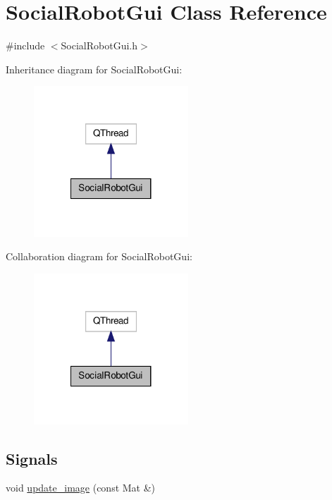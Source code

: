 \hypertarget{classSocialRobotGui}{\section{Social\-Robot\-Gui Class Reference}
\label{classSocialRobotGui}
}


{\ttfamily \#include $<$Social\-Robot\-Gui.\-h$>$}



Inheritance diagram for Social\-Robot\-Gui\-:\nopagebreak
\begin{figure}[H]
\begin{center}
\leavevmode
\includegraphics[width=164pt]{classSocialRobotGui__inherit__graph}
\end{center}
\end{figure}


Collaboration diagram for Social\-Robot\-Gui\-:\nopagebreak
\begin{figure}[H]
\begin{center}
\leavevmode
\includegraphics[width=164pt]{classSocialRobotGui__coll__graph}
\end{center}
\end{figure}
\subsection*{Signals}
\begin{DoxyCompactItemize}
\item 
void \hyperlink{classSocialRobotGui_aba07bb0bb3b8fa3f317539e9d6698aee}{update\-\_\-image} (const Mat \&)
\end{DoxyCompactItemize}
